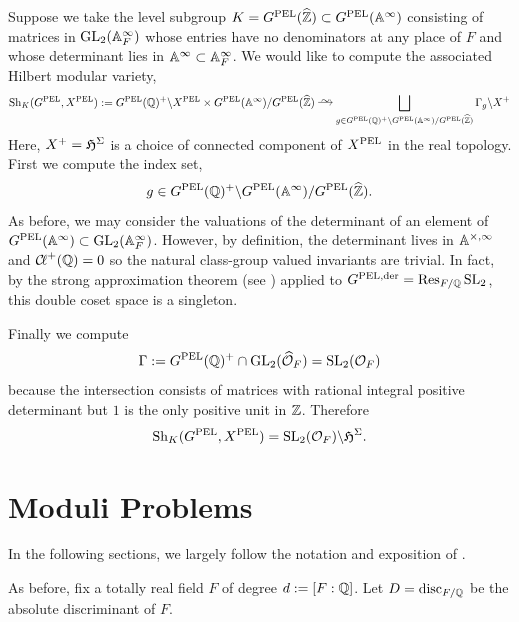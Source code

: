 \documentclass[main.tex]{subfiles}
\begin{document}
\begin{example}
Suppose we take the level subgroup $K = G^{\mathrm{PEL}}(\widehat{\mathbb{Z}}) \subset G^{\mathrm{PEL}}(\mathbb{A}^{\infty})$ consisting of matrices in $\mathrm{GL}_2(\mathbb{A}^{\infty}_F)$ whose entries have no denominators at any place of $F$ and whose determinant lies in $\mathbb{A}^{\infty} \subset \mathbb{A}^{\infty}_F$. We would like to compute the associated Hilbert modular variety,
\[ \Sh_K(G^{\PEL}, X^{\PEL}) := G^{\PEL}(\QQ)^+ \backslash X^{\PEL} \times G^{\PEL}(\A^{\infty}) / G^{\PEL}(\widehat{\Z}) \iso \bigsqcup_{g \in G^{\PEL}(\QQ)^+ \backslash G^{\PEL}(\A^{\infty}) / G^{\PEL}(\widehat{\Z})} \Gamma_g \backslash X^+ \] 
Here, $X^+ = \mathfrak{H}^{\Sigma}$ is a choice of connected component of $X^{\mathrm{PEL}}$ in the real topology. First we compute the index set,
\[ g \in G^{\mathrm{PEL}}(\mathbb{Q})^+ \backslash G^{\mathrm{PEL}}(\mathbb{A}^{\infty}) / G^{\mathrm{PEL}}(\widehat{\mathbb{Z}}). \]
As before, we may consider the valuations of the determinant of an element of $G^{\mathrm{PEL}}(\mathbb{A}^{\infty}) \subset \mathrm{GL}_2(\mathbb{A}^{\infty}_F)$. However, by definition, the determinant lives in $\mathbb{A}^{\times,\infty}$ and $\operatorname{\mathcal{C}\!{\ell}}^+(\mathbb{Q}) = 0$ so the natural class-group valued invariants are trivial. 
In fact, by the strong approximation theorem (see \cite[Theorem~4.16]{milne:shimura_varieties}) applied to $G^{\mathrm{PEL},\mathrm{der}} = \operatorname{\mathrm{Res}}_{F/\mathbb{Q}} \mathrm{SL}_2$, this double coset space is a singleton. 
\par 
Finally we compute
\[  \Gamma := G^{\mathrm{PEL}}(\mathbb{Q})^+ \cap \mathrm{GL}_2(\widehat{\mathcal{O}}_F) = \mathrm{SL}_2(\mathcal{O}_F) \]
because the intersection consists of matrices with rational integral positive determinant but $1$ is the only positive unit in $\mathbb{Z}$. Therefore
\[\mathrm{Sh}_K(G^{\mathrm{PEL}}, X^{\mathrm{PEL}}) = \mathrm{SL}_2(\mathcal{O}_F) \backslash \mathfrak{H}^{\Sigma}. \]
\end{example}


\section{Moduli Problems}


In the following sections, we largely follow the notation and exposition of \cite{goren_deshalit:foliations_shimura, diamond:serre_weight, diamond:hilbert_modular}.

As before, fix a totally real field $F$ of degree $d := [F : \mathbb{Q}]$. Let $D = \mathrm{disc}_{F/\mathbb{Q}}$ be the absolute discriminant of $F$. 
\end{document}
